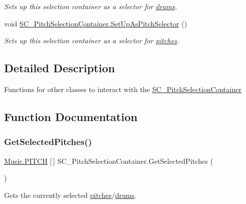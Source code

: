 \begin{DoxyCompactItemize}
\begin{DoxyCompactList}\small\item\em Sets up this selection container as a selector for \hyperlink{group___music_enums_gade475b4382c7066d1af13e7c13c029b6}{drums}. \end{DoxyCompactList}\item 
void \hyperlink{group___s_c___p_s_c_pub_func_gaf6e9338cfe7202df9787304e49afa24d}{S\+C\+\_\+\+Pitch\+Selection\+Container.\+Set\+Up\+As\+Pitch\+Selector} ()
\begin{DoxyCompactList}\small\item\em Sets up this selection container as a selector for \hyperlink{group___music_enums_ga508f69b199ea518f935486c990edac1d}{pitches}. \end{DoxyCompactList}\end{DoxyCompactItemize}


\subsection{Detailed Description}
Functions for other classes to interact with the \hyperlink{class_s_c___pitch_selection_container}{S\+C\+\_\+\+Pitch\+Selection\+Container} 

\subsection{Function Documentation}
\mbox{\label{group___s_c___p_s_c_pub_func_ga05750cc6e1199f1522f8b87d6579dc34}} 
\subsubsection{\texorpdfstring{Get\+Selected\+Pitches()}{GetSelectedPitches()}}
{\footnotesize\ttfamily \hyperlink{group___music_enums_ga508f69b199ea518f935486c990edac1d}{Music.\+P\+I\+T\+CH} \mbox{[}$\,$\mbox{]} S\+C\+\_\+\+Pitch\+Selection\+Container.\+Get\+Selected\+Pitches (\begin{DoxyParamCaption}{ }\end{DoxyParamCaption})}



Gets the currently selected \hyperlink{group___music_enums_ga508f69b199ea518f935486c990edac1d}{pitches}/\hyperlink{group___music_enums_gade475b4382c7066d1af13e7c13c029b6}{drums}. 

